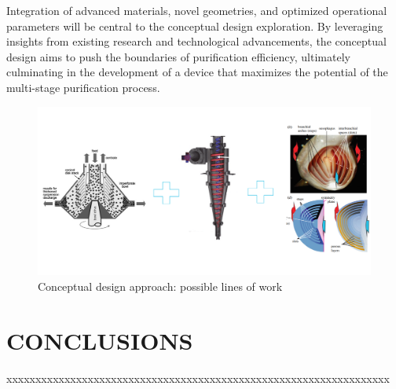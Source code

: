 \noindent Integration of advanced materials, novel geometries, and optimized operational parameters will be central to the conceptual design exploration. By leveraging insights from existing research and technological advancements, the conceptual design aims to push the boundaries of purification efficiency, ultimately culminating in the development of a device that maximizes the potential of the multi-stage purification process. 


\begin{figure}[H]
	\centering
	\includegraphics[width=1\linewidth]{design_conceptual.png}
	\captionsetup{font=bf, size=small}
	\caption{Conceptual design approach: possible lines of work}
	\label{design_conceptual}
\end{figure}



\newpage

\section{CONCLUSIONS}








 
xxxxxxxxxxxxxxxxxxxxxxxxxxxxxxxxxxxxxxxxxxxxxxxxxxxxxxxxxxxxxxxxxx





